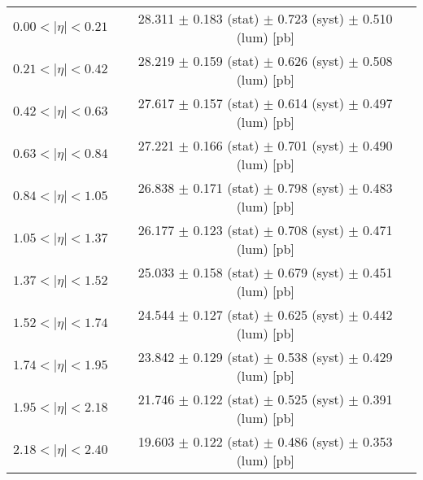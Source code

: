 \begin{tabular}{lc}
\hline
$0.00 < |\eta| <0.21$          & 28.311 $\pm$ 0.183 (stat) $\pm$ 0.723 (syst) $\pm$ 0.510 (lum) [pb]  \\
$0.21 < |\eta| <0.42$          & 28.219 $\pm$ 0.159 (stat) $\pm$ 0.626 (syst) $\pm$ 0.508 (lum) [pb]  \\
$0.42 < |\eta| <0.63$          & 27.617 $\pm$ 0.157 (stat) $\pm$ 0.614 (syst) $\pm$ 0.497 (lum) [pb]  \\
$0.63 < |\eta| <0.84$          & 27.221 $\pm$ 0.166 (stat) $\pm$ 0.701 (syst) $\pm$ 0.490 (lum) [pb]  \\
$0.84 < |\eta| <1.05$          & 26.838 $\pm$ 0.171 (stat) $\pm$ 0.798 (syst) $\pm$ 0.483 (lum) [pb]  \\
$1.05 < |\eta| <1.37$          & 26.177 $\pm$ 0.123 (stat) $\pm$ 0.708 (syst) $\pm$ 0.471 (lum) [pb]  \\
$1.37 < |\eta| <1.52$          & 25.033 $\pm$ 0.158 (stat) $\pm$ 0.679 (syst) $\pm$ 0.451 (lum) [pb]  \\
$1.52 < |\eta| <1.74$          & 24.544 $\pm$ 0.127 (stat) $\pm$ 0.625 (syst) $\pm$ 0.442 (lum) [pb]  \\
$1.74 < |\eta| <1.95$          & 23.842 $\pm$ 0.129 (stat) $\pm$ 0.538 (syst) $\pm$ 0.429 (lum) [pb]  \\
$1.95 < |\eta| <2.18$          & 21.746 $\pm$ 0.122 (stat) $\pm$ 0.525 (syst) $\pm$ 0.391 (lum) [pb]  \\
$2.18 < |\eta| <2.40$          & 19.603 $\pm$ 0.122 (stat) $\pm$ 0.486 (syst) $\pm$ 0.353 (lum) [pb]  \\
\hline
\end{tabular}
